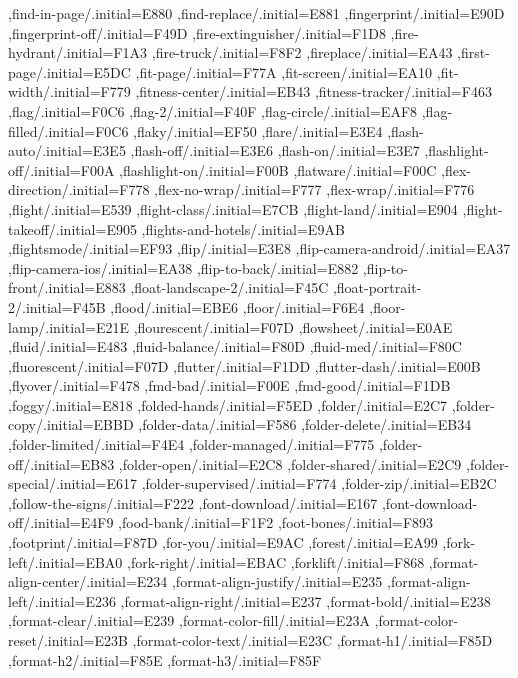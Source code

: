 { ,find-in-page/.initial=E880
 ,find-replace/.initial=E881
 ,fingerprint/.initial=E90D
 ,fingerprint-off/.initial=F49D
 ,fire-extinguisher/.initial=F1D8
 ,fire-hydrant/.initial=F1A3
 ,fire-truck/.initial=F8F2
 ,fireplace/.initial=EA43
 ,first-page/.initial=E5DC
 ,fit-page/.initial=F77A
 ,fit-screen/.initial=EA10
 ,fit-width/.initial=F779
 ,fitness-center/.initial=EB43
 ,fitness-tracker/.initial=F463
 ,flag/.initial=F0C6
 ,flag-2/.initial=F40F
 ,flag-circle/.initial=EAF8
 ,flag-filled/.initial=F0C6
 ,flaky/.initial=EF50
 ,flare/.initial=E3E4
 ,flash-auto/.initial=E3E5
 ,flash-off/.initial=E3E6
 ,flash-on/.initial=E3E7
 ,flashlight-off/.initial=F00A
 ,flashlight-on/.initial=F00B
 ,flatware/.initial=F00C
 ,flex-direction/.initial=F778
 ,flex-no-wrap/.initial=F777
 ,flex-wrap/.initial=F776
 ,flight/.initial=E539
 ,flight-class/.initial=E7CB
 ,flight-land/.initial=E904
 ,flight-takeoff/.initial=E905
 ,flights-and-hotels/.initial=E9AB
 ,flightsmode/.initial=EF93
 ,flip/.initial=E3E8
 ,flip-camera-android/.initial=EA37
 ,flip-camera-ios/.initial=EA38
 ,flip-to-back/.initial=E882
 ,flip-to-front/.initial=E883
 ,float-landscape-2/.initial=F45C
 ,float-portrait-2/.initial=F45B
 ,flood/.initial=EBE6
 ,floor/.initial=F6E4
 ,floor-lamp/.initial=E21E
 ,flourescent/.initial=F07D
 ,flowsheet/.initial=E0AE
 ,fluid/.initial=E483
 ,fluid-balance/.initial=F80D
 ,fluid-med/.initial=F80C
 ,fluorescent/.initial=F07D
 ,flutter/.initial=F1DD
 ,flutter-dash/.initial=E00B
 ,flyover/.initial=F478
 ,fmd-bad/.initial=F00E
 ,fmd-good/.initial=F1DB
 ,foggy/.initial=E818
 ,folded-hands/.initial=F5ED
 ,folder/.initial=E2C7
 ,folder-copy/.initial=EBBD
 ,folder-data/.initial=F586
 ,folder-delete/.initial=EB34
 ,folder-limited/.initial=F4E4
 ,folder-managed/.initial=F775
 ,folder-off/.initial=EB83
 ,folder-open/.initial=E2C8
 ,folder-shared/.initial=E2C9
 ,folder-special/.initial=E617
 ,folder-supervised/.initial=F774
 ,folder-zip/.initial=EB2C
 ,follow-the-signs/.initial=F222
 ,font-download/.initial=E167
 ,font-download-off/.initial=E4F9
 ,food-bank/.initial=F1F2
 ,foot-bones/.initial=F893
 ,footprint/.initial=F87D
 ,for-you/.initial=E9AC
 ,forest/.initial=EA99
 ,fork-left/.initial=EBA0
 ,fork-right/.initial=EBAC
 ,forklift/.initial=F868
 ,format-align-center/.initial=E234
 ,format-align-justify/.initial=E235
 ,format-align-left/.initial=E236
 ,format-align-right/.initial=E237
 ,format-bold/.initial=E238
 ,format-clear/.initial=E239
 ,format-color-fill/.initial=E23A
 ,format-color-reset/.initial=E23B
 ,format-color-text/.initial=E23C
 ,format-h1/.initial=F85D
 ,format-h2/.initial=F85E
 ,format-h3/.initial=F85F
}
